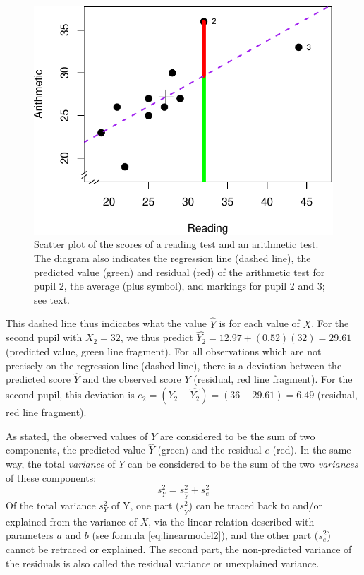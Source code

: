 \documentclass[
]{book}
\begin{document}
\begin{figure}

{\centering \includegraphics{QMS-EN_files/figure-latex/cito-linearmodel-1} 

}

\caption{Scatter plot of the scores of a reading test and an arithmetic test. The diagram also indicates the regression line (dashed line), the predicted value (green) and residual (red) of the arithmetic test for pupil 2, the average (plus symbol), and markings for pupil 2 and 3; see text.}\label{fig:cito-linearmodel}
\end{figure}

This dashed line thus indicates what the value \(\widehat{Y}\) is for
each value of \(X\). For the second pupil with \(X_2 = 32\),
we thus predict \(\widehat{Y_2} = 12.97 + (0.52) (32) = 29.61\)
(predicted value, green line fragment). For all observations which are not
precisely on the regression line (dashed line),
there is a deviation between the predicted
score \(\widehat{Y}\) and the observed score \(Y\) (residual, red line
fragment). For the second pupil, this deviation is
\(e_2 = (Y_2 - \widehat{Y_2}) = (36-29.61) = 6.49\) (residual, red
line fragment).

As stated, the observed values of \(Y\) are considered to be the
sum of two components, the predicted value \(\widehat{Y}\)
(green) and the residual \(e\) (red). In the same way, the total \emph{variance}
of \(Y\) can be considered to be the sum of the two \emph{variances} of these
components:
\begin{equation}
    s^2_{Y} = s^2_{\widehat{Y}} + s^2_e
  \label{eq:variance-pred-res}
\end{equation}
Of the total variance
\(s^2_Y\) of Y, one part (\(s^2_{\widehat{Y}}\)) can be traced back to and/or
explained from the variance of \(X\), via the linear relation described
with parameters \(a\) and \(b\) (see
formula \eqref{eq:linearmodel2}), and the other part (\(s^2_e\)) cannot be retraced
or explained. The second part, the non-predicted variance of the residuals is also called
the residual variance or unexplained variance.
\end{document}

